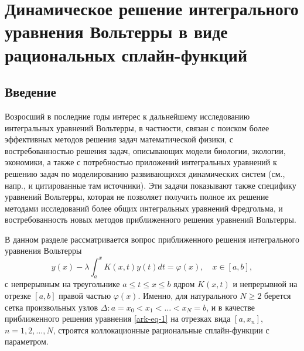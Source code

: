 
\chapter{Динамическое решение интегрального уравнения Вольтерры в виде
рациональных сплайн-функций}
%

\section{Введение}

Возросший в последние годы интерес к дальнейшему исследованию интегральных уравнений
Вольтерры, в частности, связан с поиском более эффективных методов решения задач
математической физики, с востребованностью решения задач, описывающих модели
биологии, экологии, экономики, а также с потребностью приложений интегральных уравнений
к решению задач по моделированию развивающихся динамических систем (см., напр., \cite{ark-3}
и цитированные там источники). Эти задачи показывают также специфику
уравнений Вольтерры, которая не позволяет получить полное их решение методами
исследований более общих интегральных уравнений Фредгольма, и востребованность новых методов
приближенного решения уравнений Вольтерры.

В данном разделе рассматривается вопрос приближенного решения интегрального уравнения
 Вольтерры
\begin{equation}\label{ark-eq-1}
y(x)-\lambda \int_a^x K(x,t)y(t) dt=\varphi(x),\quad x\in[a,b],
\end{equation}
с непрерывным на треугольнике $a\leqslant t\leqslant x\leqslant b$ ядром $K(x,t)$
и непрерывной на отрезке $[a,b]$ правой частью $\varphi(x)$. Именно, для натурального
$N\geqslant 2$ берется сетка произвольных узлов $\Delta:a=x_0<x_1<\dots <x_N=b$,  и
в качестве приближенного решения уравнения \eqref{ark-eq-1} на отрезках вида $[a,x_n]$,
$n=1,2,\dots,N$, строятся коллокационные рациональные сплайн-функции с параметром.

